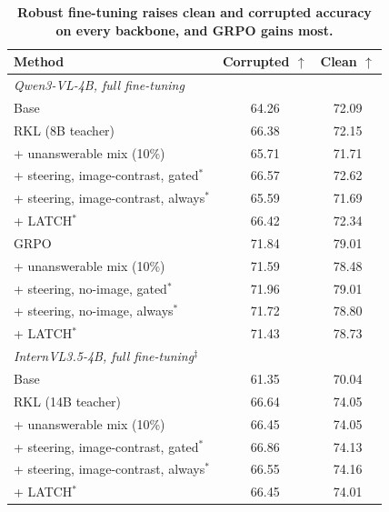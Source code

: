 \begin{table}[t]
\centering
\caption{\textbf{Robust fine-tuning raises clean and corrupted accuracy on every backbone,
and GRPO gains most.}}
\label{tab:accuracy}
\small
\setlength{\tabcolsep}{4pt}
\begin{tabular}{lcc}
\toprule
Method & Corrupted $\uparrow$ & Clean $\uparrow$ \\
\midrule
\multicolumn{3}{l}{\textit{Qwen3-VL-4B, full fine-tuning}} \\
Base                                          & 64.26 & 72.09 \\
RKL (8B teacher)                              & 66.38 & 72.15 \\
\quad + unanswerable mix (10\%)               & 65.71 & 71.71 \\
\quad + steering, image-contrast, gated$^\ast$  & 66.57 & 72.62 \\
\quad + steering, image-contrast, always$^\ast$ & 65.59 & 71.69 \\
\quad + LATCH$^\ast$                          & 66.42 & 72.34 \\
GRPO                                          & 71.84 & 79.01 \\
\quad + unanswerable mix (10\%)               & 71.59 & 78.48 \\
\quad + steering, no-image, gated$^\ast$      & 71.96 & 79.01 \\
\quad + steering, no-image, always$^\ast$     & 71.72 & 78.80 \\
\quad + LATCH$^\ast$                          & 71.43 & 78.73 \\
\midrule
\multicolumn{3}{l}{\textit{InternVL3.5-4B, full fine-tuning$^\ddagger$}} \\
Base                                          & 61.35 & 70.04 \\
RKL (14B teacher)                             & 66.64 & 74.05 \\
\quad + unanswerable mix (10\%)               & 66.45 & 74.05 \\
\quad + steering, image-contrast, gated$^\ast$  & 66.86 & 74.13 \\
\quad + steering, image-contrast, always$^\ast$ & 66.55 & 74.16 \\
\quad + LATCH$^\ast$                          & 66.45 & 74.01 \\

\end{tabular}
\end{table}
